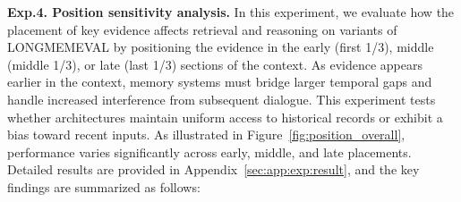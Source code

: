 \textbf{Exp.4. Position sensitivity analysis.}
In this experiment, we evaluate how the placement of key evidence affects retrieval and reasoning on variants of LONGMEMEVAL by positioning the evidence in the early (first 1/3), middle (middle 1/3), or late (last 1/3) sections of the context. As evidence appears earlier in the context, memory systems must bridge larger temporal gaps and handle increased interference from subsequent dialogue. This experiment tests whether architectures maintain uniform access to historical records or exhibit a bias toward recent inputs. As illustrated in Figure~\ref{fig:position_overall}, performance varies significantly across early, middle, and late placements. 
Detailed results are provided in Appendix~\ref{sec:app:exp:result}, and the key findings are summarized as follows:



